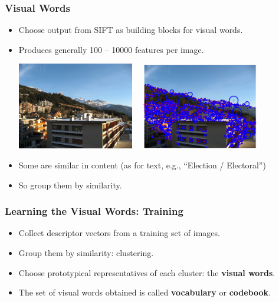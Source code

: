 \documentclass[10pt]{beamer}
\begin{document}
\begin{frame}
  \frametitle{Visual Words}
  
  \begin{itemize}
  \item Choose output from SIFT as building blocks for visual words.
  \item Produces generally 100 -- 10000 features per image.
    \begin{center}
      \includegraphics[width=0.4\textwidth]{FIGURES/crans_1_small}~~
      \includegraphics[width=0.4\textwidth]{FIGURES/cranswithsift}
    \end{center}
  \item Some are similar in content (as for text, e.g., ``Election / Electoral'')
  \item So group them by similarity.
  \end{itemize}
\end{frame}

\begin{frame}
  \frametitle{Learning the Visual Words: Training}
  \begin{itemize}
  \item Collect descriptor vectors from a training set of images.
  \item Group them by similarity: clustering.
  \item Choose prototypical representatives of each cluster: the \textbf{visual words}.
  \item The set of visual words obtained is called \textbf{vocabulary} or \textbf{codebook}.
  \end{itemize}
\end{frame}


\end{document}
